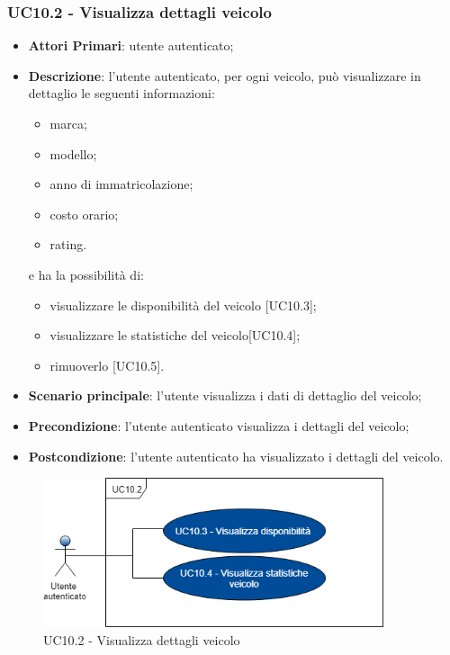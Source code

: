 \subsubsection{UC10.2 - Visualizza dettagli veicolo}
\begin{itemize}
	\item \textbf{Attori Primari}: utente autenticato;
	\item \textbf{Descrizione}: l'utente autenticato, per ogni veicolo, può visualizzare in dettaglio le seguenti informazioni:
	\begin{itemize}
		\item marca;
		\item modello;
		\item anno di immatricolazione;
		\item costo orario;
		\item rating.
	\end{itemize}
	e ha la possibilità di:
	\begin{itemize}
		\item visualizzare le disponibilità del veicolo [UC10.3];
		\item visualizzare le statistiche del veicolo[UC10.4];
		\item rimuoverlo [UC10.5].
	\end{itemize}
	\item \textbf{Scenario principale}: l'utente visualizza i dati di dettaglio del veicolo;
	\item \textbf{Precondizione}: l'utente autenticato visualizza i dettagli del veicolo;
	\item \textbf{Postcondizione}: l'utente autenticato ha visualizzato i dettagli del veicolo.
\end{itemize}
\begin{figure}[H]
	\includegraphics[width=10cm]{res/images/UC11Dettagli.png}
	\centering
	\caption{UC10.2 - Visualizza dettagli veicolo}
\end{figure}
